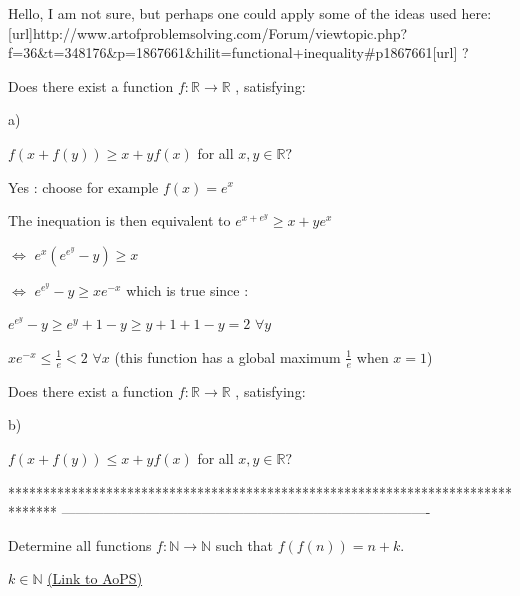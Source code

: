\begin{solution}
	Hello, I am not sure, but perhaps one could apply some of the ideas used here: [url]http://www.artofproblemsolving.com/Forum/viewtopic.php?f=36&t=348176&p=1867661&hilit=functional+inequality#p1867661[\/url] ?
\end{solution}



\begin{solution}
	\begin{tcolorbox}Does there exist a function $ f :\mathbb{R}\to\mathbb{R} $ , satisfying:
\begin{italicized}a)\end{italicized} $ f(x+f(y))\geq x+yf(x) $ for all $ x,y\in\mathbb{R}? $\end{tcolorbox}
Yes : choose for example $f(x)=e^x$ 

The inequation is then equivalent to $e^{x+e^y}\ge x+ye^x$

$\iff$ $e^x\left(e^{e^y}-y\right)\ge x$

$\iff$ $e^{e^y}-y\ge xe^{-x}$ which is true since :

$e^{e^y}-y\ge e^y+1-y\ge y+1+1-y=2$ $\forall y$

$xe^{-x}\le \frac 1e<2$ $\forall x$ (this function has a global maximum $\frac 1e$ when $x=1$)
\end{solution}



\begin{solution}
	\begin{tcolorbox}Does there exist a function $ f :\mathbb{R}\to\mathbb{R} $ , satisfying:
\begin{italicized}b)\end{italicized} $ f(x+f(y))\leq x+yf(x) $ for all $ x,y\in\mathbb{R}? $\end{tcolorbox}


\end{solution}
*******************************************************************************
-------------------------------------------------------------------------------

\begin{problem}
	Determine all functions  $f : \mathbb{N} \rightarrow \mathbb{N} $ such that  $f(f(n))=n+k$.

$k \in  \mathbb{N}$
	\flushright \href{https://artofproblemsolving.com/community/c6h495097}{(Link to AoPS)}
\end{problem}



